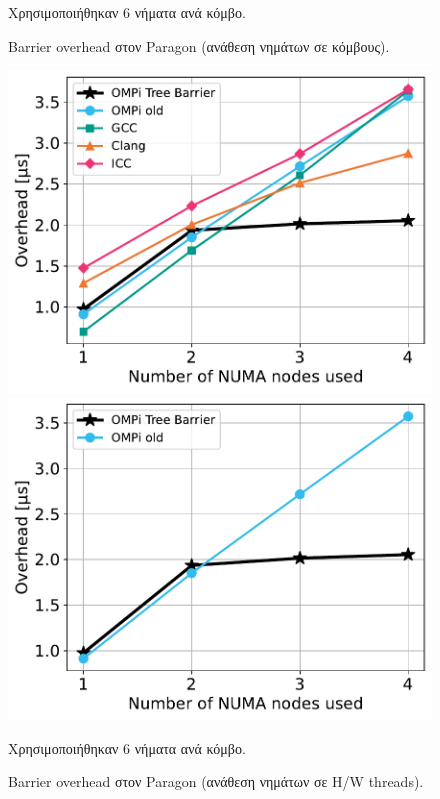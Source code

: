 \begin{figure}[htbp]
\begin{minipage}{0.48\textwidth}
    \end{minipage}
    \newline \newline
    {\small Χρησιμοποιήθηκαν 6 νήματα ανά κόμβο.}
    \caption{Barrier overhead στον Paragon (ανάθεση νημάτων σε κόμβους).}
    \label{fig:bo-paragon-toponodes}
\end{figure}

\begin{figure}[htbp]
    \centering
    \begin{minipage}{0.48\textwidth}
        \centering
        \includegraphics[width=1\textwidth]{Figures/paragon-epcc/topothreads_tpn-6_close.pdf}
    \end{minipage}\hfill
    \begin{minipage}{0.48\textwidth}
        \centering
        \includegraphics[width=1\textwidth]{Figures/paragon-epcc/ompionly_topothreads_tpn-6_close.pdf}
    \end{minipage}
    \newline \newline
    {\small Χρησιμοποιήθηκαν 6 νήματα ανά κόμβο.}
    \caption{Barrier overhead στον Paragon (ανάθεση νημάτων σε H/W threads).}
    \label{fig:bo-paragon-topothreads}
\end{figure}

